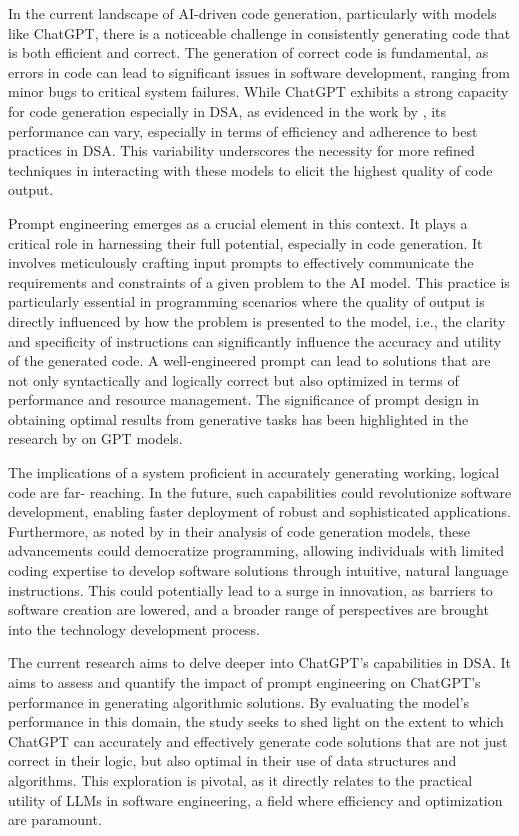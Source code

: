 In the current landscape of AI-driven code generation, particularly with models like ChatGPT, 
there is a noticeable challenge in consistently generating code that is both efficient and 
correct. The generation of correct code is fundamental, as errors in code can lead to 
significant issues in software development, ranging from minor bugs to critical system 
failures. While ChatGPT exhibits a strong capacity for code generation especially in DSA, as 
evidenced in the work by \cite{arefin2023unmasking}, its performance can vary, especially in 
terms of efficiency and adherence to best practices in DSA. This variability underscores the 
necessity for more refined techniques in interacting with these models to elicit the highest 
quality of code output.

Prompt engineering emerges as a crucial element in this context. It plays a critical role in 
harnessing their full potential, especially in code generation. It involves meticulously 
crafting input prompts to effectively communicate the requirements and constraints of a given 
problem to the AI model. This practice is particularly essential in programming scenarios where 
the quality of output is directly influenced by how the problem is presented to the model, 
i.e., the clarity and specificity of instructions can significantly influence the accuracy and 
utility of the generated code. A well-engineered prompt can lead to solutions that are not only 
syntactically and logically correct but also optimized in terms of performance and resource 
management. The significance of prompt design in obtaining optimal results from generative 
tasks has been highlighted in the research by \cite{chen2021evaluating} on GPT models.

The implications of a system proficient in accurately generating working, logical code are far-
reaching. In the future, such capabilities could revolutionize software development, enabling 
faster deployment of robust and sophisticated applications. Furthermore, as noted by \cite{chen2021evaluating} in their analysis of code generation models, these advancements could democratize 
programming, allowing individuals with limited coding expertise to develop software solutions 
through intuitive, natural language instructions. This could potentially lead to a surge in 
innovation, as barriers to software creation are lowered, and a broader range of perspectives 
are brought into the technology development process.

The current research aims to delve deeper into ChatGPT’s capabilities in DSA. It aims to assess 
and quantify the impact of prompt engineering on ChatGPT’s performance in generating 
algorithmic solutions. By evaluating the model’s performance in this domain, the study seeks to 
shed light on the extent to which ChatGPT can accurately and effectively generate code 
solutions that are not just correct in their logic, but also optimal in their use of data 
structures and algorithms. This exploration is pivotal, as it directly relates to the practical 
utility of LLMs in software engineering, a field where efficiency and optimization are 
paramount.





